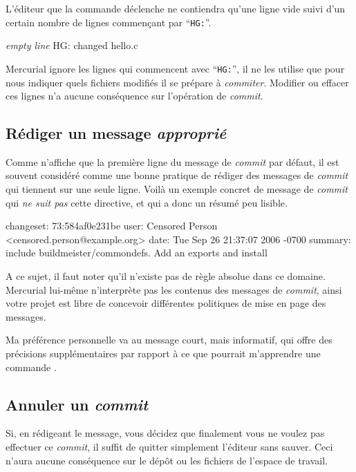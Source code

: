 L'éditeur que la commande  déclenche ne contiendra
qu'une ligne vide suivi d'un certain nombre de lignes commençant
par ``\texttt{HG:}''.
\begin{codesample2}
  \emph{empty line}
  HG: changed hello.c
\end{codesample2}
Mercurial ignore les lignes qui commencent avec ``\texttt{HG:}'', il 
ne les utilise que pour nous indiquer quels fichiers modifiés il se 
prépare à \textit{commiter}. Modifier ou effacer ces lignes n'a 
aucune conséquence sur l'opération de \textit{commit}.

\subsection{Rédiger un message \textit{approprié}}

Comme  n'affiche que la première ligne du message de
\textit{commit} par défaut, il est souvent considéré comme une bonne
pratique de rédiger des messages de \textit{commit} qui tiennent
sur une seule ligne. Voilà un exemple concret de message de 
\textit{commit} qui \emph{ne suit pas} cette directive, et qui a donc
un résumé peu lisible.

\begin{codesample2}
  changeset:   73:584af0e231be
  user:        Censored Person <censored.person@example.org>
  date:        Tue Sep 26 21:37:07 2006 -0700
  summary:     include buildmeister/commondefs.   Add an exports and install
\end{codesample2}

A ce sujet, il faut noter qu'il n'existe pas de règle absolue dans ce 
domaine. Mercurial lui-même n'interprète pas les contenus des messages
de \textit{commit}, ainsi votre projet est libre de concevoir différentes
politiques de mise en page des messages.

Ma préférence personnelle va au message court, mais informatif, qui offre
des précisions supplémentaires par rapport à ce que pourrait m'apprendre une commande
.

\subsection{Annuler un \textit{commit}}

Si, en rédigeant le message, vous décidez que finalement vous ne 
voulez pas effectuer ce \textit{commit}, il suffit de quitter simplement
l'éditeur sans sauver. Ceci n'aura aucune conséquence sur le dépôt ou
les fichiers de l'espace de travail.

